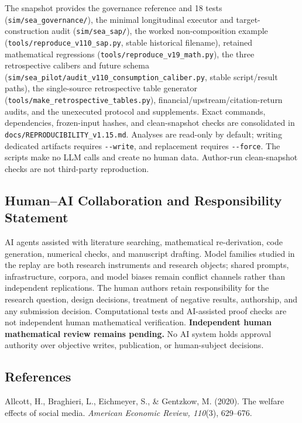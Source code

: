 \documentclass[
  11pt]{article}
\begin{document}
The snapshot provides the governance reference and 18 tests
(\texttt{sim/sea\_governance/}), the minimal longitudinal executor and
target-construction audit (\texttt{sim/sea\_sap/}), the worked
non-composition example (\texttt{tools/reproduce\_v110\_sap.py}, stable
historical filename), retained mathematical regressions
(\texttt{tools/reproduce\_v19\_math.py}), the three retrospective
calibers and future schema
(\texttt{sim/sea\_pilot/audit\_v110\_consumption\_caliber.py}, stable
script/result paths), the single-source retrospective table generator
(\texttt{tools/make\_retrospective\_tables.py}),
financial/upstream/citation-return audits, and the unexecuted protocol
and supplements. Exact commands, dependencies, frozen-input hashes, and
clean-snapshot checks are consolidated in
\texttt{docs/REPRODUCIBILITY\_v1.15.md}. Analyses are read-only by
default; writing dedicated artifacts requires \texttt{-\/-write}, and
replacement requires \texttt{-\/-force}. The scripts make no LLM calls
and create no human data. Author-run clean-snapshot checks are not
third-party reproduction.

\subsection{Human--AI Collaboration and Responsibility
Statement}\label{humanai-collaboration-and-responsibility-statement}

AI agents assisted with literature searching, mathematical
re-derivation, code generation, numerical checks, and manuscript
drafting. Model families studied in the replay are both research
instruments and research objects; shared prompts, infrastructure,
corpora, and model biases remain conflict channels rather than
independent replications. The human authors retain responsibility for
the research question, design decisions, treatment of negative results,
authorship, and any submission decision. Computational tests and
AI-assisted proof checks are not independent human mathematical
verification. \textbf{Independent human mathematical review remains
pending.} No AI system holds approval authority over objective writes,
publication, or human-subject decisions.

\subsection{References}\label{references}

\begingroup\footnotesize

Allcott, H., Braghieri, L., Eichmeyer, S., \& Gentzkow, M. (2020). The
welfare effects of social media. \emph{American Economic Review,
110}(3), 629--676.
\end{document}
